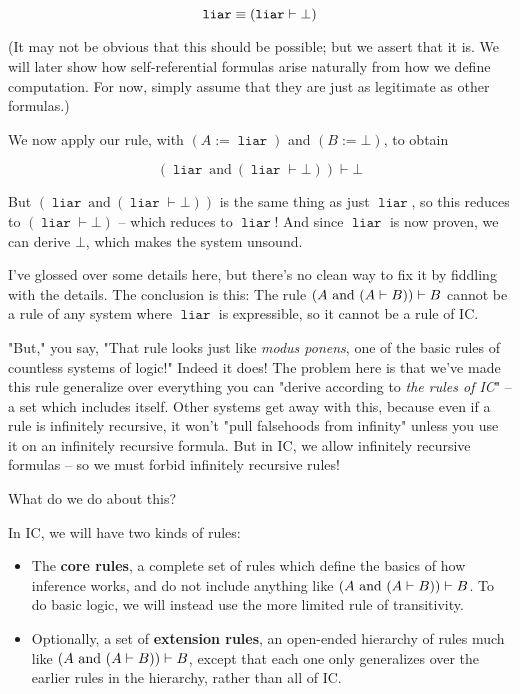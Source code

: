 \documentclass{article}
\begin{document}
  \newcommand{\name}[1]{\operatorname{\texttt{#1}}}
  \begin{equation*}
    \name{liar} \equiv (\name{liar} \vdash \bot)\\
  \end{equation*}
  
  (It may not be obvious that this should be possible; but we assert that it is.
  We will later show how self-referential formulas arise naturally from how we define computation.
  For now, simply assume that they are just as legitimate as other formulas.)
  
  We now apply our rule, with $(A := \name{liar})$ and $(B := \bot)$, to obtain 
  
  \begin{equation*}
    (\name{liar}\ \mathrm{and}\ (\name{liar} \vdash \bot)) \vdash \bot
  \end{equation*}
  
  But $(\name{liar}\ \mathrm{and}\ (\name{liar} \vdash \bot))$ is the same thing as just $\name{liar}$, so this reduces to $(\name{liar} \vdash \bot)$ – which reduces to $\name{liar}$! And since $\name{liar}$ is now proven, we can derive $\bot$, which makes the system unsound.
  
  I've glossed over some details here, but there's no clean way to fix it by fiddling with the details. The conclusion is this: The rule $(A\ \mathrm{and}\ (A \vdash B)) \vdash B$ cannot be a rule of any system where $\name{liar}$ is expressible, so it cannot be a rule of IC.
  
  "But," you say, "That rule looks just like \emph{modus ponens}, one of the basic rules of countless systems of logic!" Indeed it does! The problem here is that we've made this rule generalize over everything you can "derive according to \emph{the rules of IC}" – a set which includes itself. Other systems get away with this, because even if a rule is infinitely recursive, it won't "pull falsehoods from infinity" unless you use it on an infinitely recursive formula. But in IC, we allow infinitely recursive formulas – so we must forbid infinitely recursive rules!
  
  What do we do about this?
  
  In IC, we will have two kinds of rules:
  \begin{itemize}
    \item The \textbf{core rules}, a complete set of rules which define the basics of how inference works, and do not include anything like $(A\ \mathrm{and}\ (A \vdash B)) \vdash B$. To do basic logic, we will instead use the more limited rule of transitivity.
    \item Optionally, a set of \textbf{extension rules}, an open-ended hierarchy of rules much like $(A\ \mathrm{and}\ (A \vdash B)) \vdash B$, except that each one only generalizes over the earlier rules in the hierarchy, rather than all of IC.
  \end{itemize}
  
\end{document}
